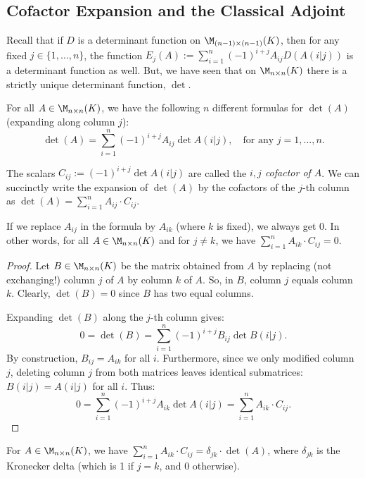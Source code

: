 \subsection{Cofactor Expansion and the Classical Adjoint}

Recall that if $D$ is a determinant function on $\M_{(n-1) \times (n-1)}(K)$, then for any fixed $j \in \{1, \dots, n\}$, the function $E_j(A) := \sum_{i=1}^n (-1)^{i+j} A_{ij} D(A(i|j))$ is a determinant function as well. But, we have seen that on $\M_{n \times n}(K)$ there is a strictly unique determinant function, $\det$.

\begin{corollary}
  \label{cor:cofactor_expansion}
  For all $A \in \M_{n \times n}(K)$, we have the following $n$ different formulas for $\det(A)$ (expanding along column $j$):
  \[
  \det(A) = \sum_{i=1}^n (-1)^{i+j} A_{ij} \det A(i|j), \quad \text{for any } j = 1, \dots, n.
  \]
\end{corollary}

The scalars $C_{ij} := (-1)^{i+j} \det A(i|j)$ are called the \emph{$i,j$ cofactor of $A$}. We can succinctly write the expansion of $\det(A)$ by the cofactors of the $j$-th column as $\det(A) = \sum_{i=1}^n A_{ij} \cdot C_{ij}$.

\begin{lemma*}\label{lem:false_cofactor}
  If we replace $A_{ij}$ in the formula by $A_{ik}$ (where $k$ is fixed), we always get $0$. In other words, for all $A \in \M_{n \times n}(K)$ and for $j \neq k$, we have $\sum_{i=1}^n A_{ik} \cdot C_{ij} = 0$.
\end{lemma*}

\begin{proof}
  Let $B \in \M_{n \times n}(K)$ be the matrix obtained from $A$ by replacing (not exchanging!) column $j$ of $A$ by column $k$ of $A$. So, in $B$, column $j$ equals column $k$. Clearly, $\det(B) = 0$ since $B$ has two equal columns.

  Expanding $\det(B)$ along the $j$-th column gives:
  \[
  0 = \det(B) = \sum_{i=1}^n (-1)^{i+j} B_{ij} \det B(i|j).
  \]
  By construction, $B_{ij} = A_{ik}$ for all $i$. Furthermore, since we only modified column $j$, deleting column $j$ from both matrices leaves identical submatrices: $B(i|j) = A(i|j)$ for all $i$. Thus:
  \[
  0 = \sum_{i=1}^n (-1)^{i+j} A_{ik} \det A(i|j) = \sum_{i=1}^n A_{ik} \cdot C_{ij}.
  \]
\end{proof}

\begin{summary} For $A \in \M_{n \times n}(K)$, we have $\sum_{i=1}^n A_{ik} \cdot C_{ij} = \delta_{jk} \cdot \det(A)$, where $\delta_{jk}$ is the Kronecker delta (which is 1 if $j=k$, and 0 otherwise).
\end{summary}

